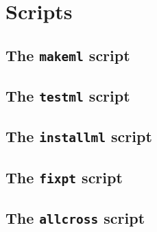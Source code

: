 
\section{Scripts}

\subsection{The {\tt makeml} script}

\subsection{The {\tt testml} script}

\subsection{The {\tt installml} script}

\subsection{The {\tt fixpt} script}

\subsection{The {\tt allcross} script}
